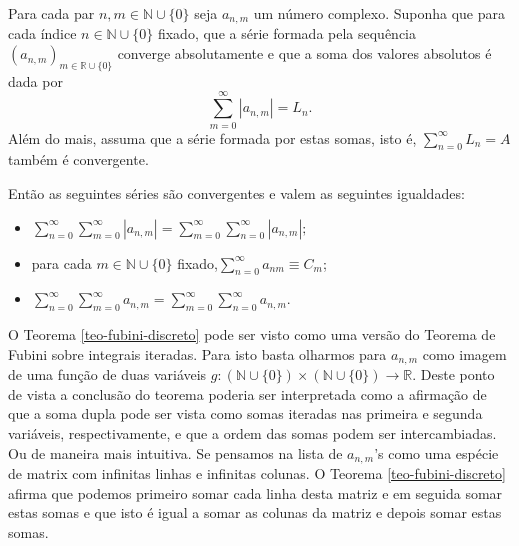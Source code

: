 \begin{teorema}\label{teo-fubini-discreto}
Para cada par $n,m\in \mathbb{N}\cup\{0\}$ seja $a_{n,m}$ um número complexo.
Suponha que para cada índice $n\in\mathbb{N}\cup\{0\}$ fixado, que a série 
formada pela sequência $(a_{n,m})_{m\in\mathbb{R}\cup\{0\}}$ converge
absolutamente e que a soma dos 
valores absolutos é dada por
\[
\sum_{m=0}^{\infty} |a_{n,m}| = L_n.
\]
Além do mais, assuma que a série formada por estas somas, isto é, 
$\sum_{n=0}^{\infty} L_n = A$ também é convergente. 

Então as seguintes
séries são convergentes e valem as seguintes igualdades:
\begin{itemize}
\item 
$
\displaystyle \sum_{n=0}^{\infty}\sum_{m=0}^{\infty}|a_{n,m}|
=
\sum_{m=0}^{\infty}\sum_{n=0}^{\infty}|a_{n,m}|;
$

\item 
para cada $m\in\mathbb{N}\cup\{0\}$ fixado,\qquad  $\displaystyle \sum_{n=0}^{\infty} a_{nm} \equiv C_m$;

\item 
$
\displaystyle
\sum_{n=0}^{\infty}\sum_{m=0}^{\infty}a_{n,m} 
=
\sum_{m=0}^{\infty}\sum_{n=0}^{\infty}a_{n,m}.
$
\end{itemize}

\end{teorema}

\bigskip 


O Teorema \ref{teo-fubini-discreto} pode ser visto como uma versão do Teorema
de Fubini sobre integrais iteradas. Para isto basta olharmos 
para $a_{n,m}$ como imagem de uma
função de duas variáveis 
$g:(\mathbb{N}\cup\{0\})\times(\mathbb{N}\cup\{0\})\to\mathbb{R}$.
Deste ponto de vista a conclusão do teorema poderia ser interpretada 
como a afirmação de que a soma dupla pode ser vista como
somas iteradas nas primeira e segunda variáveis, respectivamente, 
e que a ordem das somas podem ser intercambiadas. Ou de maneira
mais intuitiva. Se pensamos na lista de $a_{n,m}$'s como uma espécie 
de matrix com infinitas linhas e infinitas colunas. 
O Teorema \ref{teo-fubini-discreto} 
afirma que podemos primeiro somar cada linha desta matriz e em seguida
somar estas somas e que isto é igual a somar as colunas da matriz e 
depois somar estas somas.

